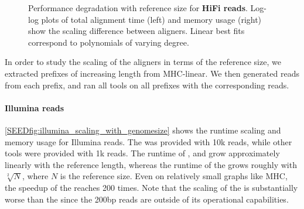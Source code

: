 \begin{figure}[H]
  \caption[Performance scaling with reference size
  (long reads)]{Performance degradation with reference size for \textbf{HiFi
  reads}. Log-log plots of total alignment time (left) and memory usage (right)
  show the scaling difference between aligners. Linear best fits correspond to
  polynomials of varying degree.}
  \label{SEEDfig:hifi_scaling_with_genomesize}
\end{figure}

In order to study the scaling of the aligners in terms of the reference size, we
extracted prefixes of increasing length from MHC-linear. We then generated reads
from each prefix, and ran all tools on all prefixes with the corresponding
reads.

\paragraph{Illumina reads}
\cref{SEEDfig:illumina_scaling_with_genomesize} shows the runtime scaling and memory
usage for Illumina reads. The \sh was provided with 10k reads, while other
tools were provided with 1k reads.
%
The runtime of \graphaligner, \pasgal and \vargas grow approximately linearly
with the reference length, whereas the runtime of the \sh grows roughly with
$\sqrt[2]{N}$, where $N$ is the reference size. Even on relatively small graphs
like MHC, the speedup of the \sh reaches 200 times. Note that the scaling of
the \prefixh is substantially worse than the \sh since the 200bp reads are
outside of its operational capabilities.

